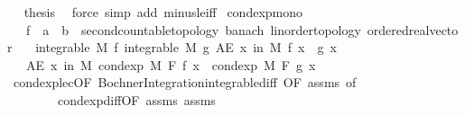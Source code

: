 \begin{isabellebody}
\ \isamarkupfalse%
\ {\isacharquery}{\kern0pt}thesis\ \isamarkupfalse%
\ {\isacharparenleft}{\kern0pt}force\ simp\ add{\isacharcolon}{\kern0pt}\ minus{\isacharunderscore}{\kern0pt}le{\isacharunderscore}{\kern0pt}iff{\isacharparenright}{\kern0pt}\isanewline
{}\isamarkupfalse%
%
\endisatagproof
{\isafoldproof}%
%
\isadelimproof
\isanewline
%
\endisadelimproof
\isanewline
{}\isamarkupfalse%
\ cond{\isacharunderscore}{\kern0pt}exp{\isacharunderscore}{\kern0pt}mono{\isacharcolon}{\kern0pt}\isanewline
\ \ \ f\ {\isacharcolon}{\kern0pt}{\isacharcolon}{\kern0pt}\ {\isachardoublequoteopen}{\isacharprime}{\kern0pt}a\ {\isasymRightarrow}\ {\isacharprime}{\kern0pt}b\ {\isacharcolon}{\kern0pt}{\isacharcolon}{\kern0pt}\ {\isacharbraceleft}{\kern0pt}second{\isacharunderscore}{\kern0pt}countable{\isacharunderscore}{\kern0pt}topology{\isacharcomma}{\kern0pt}\ banach{\isacharcomma}{\kern0pt}\ linorder{\isacharunderscore}{\kern0pt}topology{\isacharcomma}{\kern0pt}\ ordered{\isacharunderscore}{\kern0pt}real{\isacharunderscore}{\kern0pt}vector{\isacharbraceright}{\kern0pt}{\isachardoublequoteclose}\isanewline
\ \ \ {\isachardoublequoteopen}integrable\ M\ f{\isachardoublequoteclose}\ {\isachardoublequoteopen}integrable\ M\ g{\isachardoublequoteclose}\ {\isachardoublequoteopen}AE\ x\ in\ M{\isachardot}{\kern0pt}\ f\ x\ {\isasymle}\ g\ x{\isachardoublequoteclose}\isanewline
\ \ \ {\isachardoublequoteopen}AE\ x\ in\ M{\isachardot}{\kern0pt}\ cond{\isacharunderscore}{\kern0pt}exp\ M\ F\ f\ x\ {\isasymle}\ cond{\isacharunderscore}{\kern0pt}exp\ M\ F\ g\ x{\isachardoublequoteclose}\isanewline
%
\isadelimproof
\ \ %
\endisadelimproof
%
\isatagproof
{}\isamarkupfalse%
\ cond{\isacharunderscore}{\kern0pt}exp{\isacharunderscore}{\kern0pt}le{\isacharunderscore}{\kern0pt}c{\isacharbrackleft}{\kern0pt}OF\ Bochner{\isacharunderscore}{\kern0pt}Integration{\isachardot}{\kern0pt}integrable{\isacharunderscore}{\kern0pt}diff{\isacharcomma}{\kern0pt}\ OF\ assms{\isacharparenleft}{\kern0pt}{}{\isacharcomma}{\kern0pt}{}{\isacharparenright}{\kern0pt}{\isacharcomma}{\kern0pt}\ of\ {}{\isacharbrackright}{\kern0pt}\ \isanewline
\ \ \ \ \ \ \ \ cond{\isacharunderscore}{\kern0pt}exp{\isacharunderscore}{\kern0pt}diff{\isacharbrackleft}{\kern0pt}OF\ assms{\isacharparenleft}{\kern0pt}{}{\isacharcomma}{\kern0pt}{}{\isacharparenright}{\kern0pt}{\isacharbrackright}{\kern0pt}\ assms{\isacharparenleft}{\kern0pt}{}{\isacharparenright}{\kern0pt}\ \isamarkupfalse%

\end{isabellebody}
